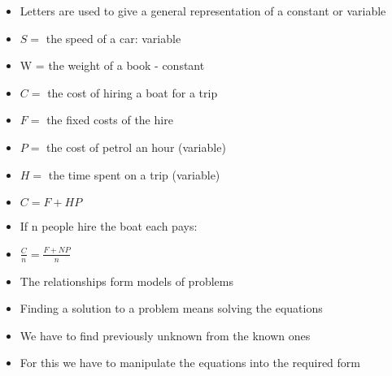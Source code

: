 \begin{frame}
\begin{itemize}
	\item Letters are used to give a general representation of a constant or variable
	\vspace*{.35cm}
	\item $S =$ the speed of a car:  variable
	\item W = the weight of a book - constant
	\end{itemize}
\end{frame}
\begin{frame}
\begin{itemize}
		\item $C =$ the cost of hiring a boat for a trip
		\item $F =$ the fixed costs of the hire
		\item $P =$ the cost of petrol an hour (variable)
		\item $H =$ the time spent on a trip (variable)
		\item $C = F + HP$
		\vspace*{.35cm}
		\item If n people hire the boat each pays:
		\item $\frac{C}{n} = \frac{F + NP}{n}$
		\end{itemize}
\end{frame}
\begin{frame}
\begin{itemize}
	\item The relationships form models of problems
	\item Finding a solution to a problem means solving the equations
	\item We have to find previously unknown from the known ones
	\item For this we have to manipulate the equations into the required form
\end{itemize}
\end{frame}
